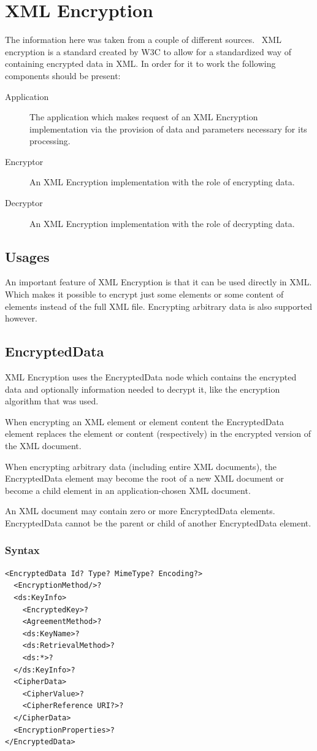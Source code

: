 \section{XML Encryption}
The information here was taken from a couple of different
sources.~\autocite{w3c_xml_encryption} XML encryption is a standard created by
W3C to allow for a standardized way of containing encrypted data in XML\@. In
order for it to work the following components should be present:

\begin{description}
    \item[Application] The application which makes request of an XML Encryption
        implementation via the provision of data and parameters necessary for
        its processing.
    \item[Encryptor] An XML Encryption implementation with the role of encrypting
        data.
    \item[Decryptor] An XML Encryption implementation with the role of decrypting
        data.
\end{description}
\subsection{Usages}
An important feature of XML Encryption is that it can be used directly in XML\@.
Which makes it possible to encrypt just some elements or some content of
elements instead of the full XML file. Encrypting arbitrary data is also
supported however.
\subsection{EncryptedData}
XML Encryption uses the EncryptedData node which contains the encrypted data and
optionally information needed to decrypt it, like the encryption algorithm that
was used.

When encrypting an XML element or element content the EncryptedData element
replaces the element or content (respectively) in the encrypted version of the
XML document.

When encrypting arbitrary data (including entire XML documents), the
EncryptedData element may become the root of a new XML document or become a
child element in an application-chosen XML document.

An XML document may contain zero or more EncryptedData elements. EncryptedData
cannot be the parent or child of another EncryptedData element.
\subsubsection{Syntax}
\begin{verbatim}
<EncryptedData Id? Type? MimeType? Encoding?>
  <EncryptionMethod/>?
  <ds:KeyInfo>
    <EncryptedKey>?
    <AgreementMethod>?
    <ds:KeyName>?
    <ds:RetrievalMethod>?
    <ds:*>?
  </ds:KeyInfo>?
  <CipherData>
    <CipherValue>?
    <CipherReference URI?>?
  </CipherData>
  <EncryptionProperties>?
</EncryptedData>
\end{verbatim}

